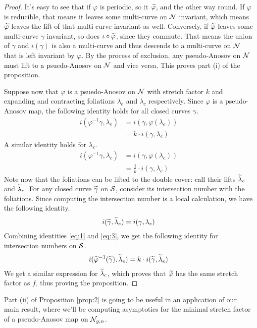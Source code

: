 \begin{proof}
  It's easy to see that if $\varphi$ is periodic, so it $\widetilde{\varphi}$, and the other way round. If $\varphi$ is reducible, that means
  it leaves some multi-curve on $\mathcal{N}$ invariant, which means $\widetilde{\varphi}$ leaves the lift of that multi-curve invariant as
  well. Conversely, if $\widetilde{\varphi}$ leaves some multi-curve $\gamma$ invariant, so does $\iota \circ \widetilde{\varphi}$, since they
  commute. That means the union of $\gamma$ and $\iota(\gamma)$ is also a multi-curve and thus descends
  to a multi-curve on $\mathcal{N}$ that is left invariant by $\varphi$. By the process of exclusion, any pseudo-Anosov
  on $\mathcal{N}$ must lift to a psuedo-Anosov on $\mathcal{N}$ and vice versa. This proves part (i) of the proposition.

  Suppose now that $\varphi$ is a psuedo-Anosov on $\mathcal{N}$ with stretch factor $k$ and expanding and contracting foliations
  $\lambda_e$ and $\lambda_c$ respectively. Since $\varphi$ is a pseudo-Anosov map, the following identity holds
  for all closed curves $\gamma$.
  \begin{align}
    \label{eq:1}
    i(\varphi^{-1}\gamma, \lambda_e) &= i(\gamma, \varphi(\lambda_e)) \\
                               &= k \cdot i(\gamma, \lambda_e)
  \end{align}
  A similar identity holds for $\lambda_c$.
  \begin{align}
    \label{eq:2}
    i(\varphi^{-1}\gamma, \lambda_c) &= i(\gamma, \varphi(\lambda_c)) \\
                               &= \frac{1}{k} \cdot i(\gamma, \lambda_c)
  \end{align}
  Note now that the foliations can be lifted to the double cover: call their lifts $\widetilde{\lambda}_e$
  and $\widetilde{\lambda}_c$. For any closed curve $\widetilde{\gamma}$ on $\mathcal{S}$, consider its intersection number
  with the foliations. Since computing the intersection number is a {\color{red} local  calculation}, we have the following
  identity.
  \begin{align}
    \label{eq:3}
    i(\widetilde{\gamma}, \widetilde{\lambda}_e) = i(\gamma, \lambda_e)
  \end{align}
  Combining identities \eqref{eq:1} and \eqref{eq:3}, we get the following identity for intersection numbers
  on $\mathcal{S}$.
  \begin{align*}
    i(\widetilde{\varphi}^{-1} (\widetilde{\gamma}), \widetilde{\lambda}_e) = k \cdot i(\widetilde{\gamma}, \widetilde{\lambda}_e)
  \end{align*}
  We get a similar expression for $\widetilde{\lambda}_c$, which proves that $\widetilde{\varphi}$ has the same stretch factor
  as $f$, thus proving the proposition.
\end{proof}
Part (ii) of Proposition \ref{prop:2} is going to be useful in an application of our main result,
where we'll be computing asymptotics for the minimal stretch factor of a pseudo-Anosov map on
$\mathcal{N}_{g,n}$.


